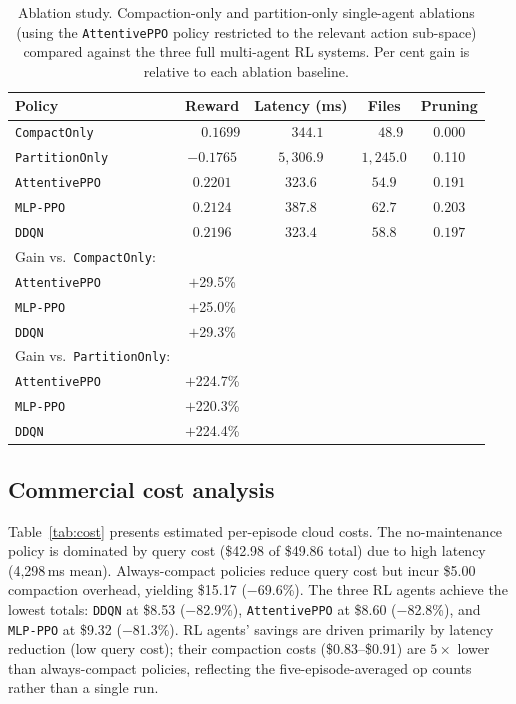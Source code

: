\documentclass[fleqn,10pt]{wlscirep}
\newcommand{\attentive}{\texttt{AttentivePPO}}
\newcommand{\mlpppo}{\texttt{MLP-PPO}}
\newcommand{\ddqn}{\texttt{DDQN}}
\begin{document}
\begin{table}[!htbp]
\centering
\begin{tabular}{lcccc}
\toprule
\textbf{Policy} & \textbf{Reward} & \textbf{Latency (ms)} &
  \textbf{Files} & \textbf{Pruning} \\
\midrule
\texttt{CompactOnly}    & $\phantom{-}0.1699$ & $\phantom{5,}344.1$ &
  $\phantom{1,}48.9$ & 0.000 \\
\texttt{PartitionOnly}  & $-0.1765$           & $5{,}306.9$ &
  $1{,}245.0$ & 0.110 \\
\midrule
\attentive{} & $\mathbf{0.2201}$ & $323.6$ & $54.9$ & $0.191$ \\
\mlpppo{}    & $0.2124$          & $387.8$ & $62.7$ & $0.203$ \\
\ddqn{}      & $0.2196$          & $323.4$ & $58.8$ & $0.197$ \\
\midrule
Gain vs.\ \texttt{CompactOnly}: &&&& \\
\quad \attentive{} & $+$29.5\% &&& \\
\quad \mlpppo{}    & $+$25.0\% &&& \\
\quad \ddqn{}      & $+$29.3\% &&& \\
Gain vs.\ \texttt{PartitionOnly}: &&&& \\
\quad \attentive{} & $+$224.7\% &&& \\
\quad \mlpppo{}    & $+$220.3\% &&& \\
\quad \ddqn{}      & $+$224.4\% &&& \\
\bottomrule
\end{tabular}
\caption{\label{tab:ablation}Ablation study. Compaction-only and partition-only
  single-agent ablations (using the \attentive{} policy restricted to
  the relevant action sub-space) compared against the three full
  multi-agent RL systems. Per cent gain is relative to each ablation baseline.}
\end{table}

\FloatBarrier

\subsection*{Commercial cost analysis}

Table~\ref{tab:cost} presents estimated per-episode cloud costs.
The no-maintenance policy is dominated by query cost (\$42.98 of
\$49.86 total) due to high latency (4,298\,ms mean).
Always-compact policies reduce query cost but incur \$5.00 compaction
overhead, yielding \$15.17 ($-$69.6\%).
The three RL agents achieve the lowest totals: \ddqn{} at \$8.53
($-$82.9\%), \attentive{} at \$8.60 ($-$82.8\%), and \mlpppo{} at
\$9.32 ($-$81.3\%).
RL agents' savings are driven primarily by latency reduction (low query
cost); their compaction costs (\$0.83--\$0.91) are $5\times$ lower
than always-compact policies, reflecting the five-episode-averaged op
counts rather than a single run.
\end{document}
